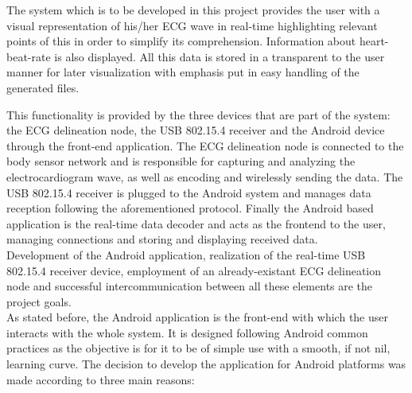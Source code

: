 		The system which is to be developed in this project provides the user with a visual representation of his/her ECG wave in real-time highlighting relevant points of this in order to simplify its comprehension. Information about heart-beat-rate %
		is also displayed. All this data is stored in a transparent to the user manner for later visualization with emphasis put in easy handling of the generated files.\\

		\begin{comment}
		¿Qué es cada parte?
		Sistema 3 partes: nodo delineador, receptor 802.15.4 y app como frontend en general. En un parrafo distino para cada una explicar las tecnologías que hemos usado y porque. 

		¿Cómo se hizo cada parte?
		(Orden, android ->shimmer->msp430->dirigir texto hacia investigación(flecha = parrafo))
		Visualizador: Android ampliamente usado, facilidad para obtener un dispositivo, no demasiado coste (al menos < iOS), plataforma abierta, desarrollo comodo.
		Shimmer: reutiliza sistema desarrollado por la complu en colaboración con EPFL
		Receptor: 

		\end{comment}
		This functionality is provided by the three devices that are part of the system: the ECG delineation node, the USB 802.15.4 receiver and the Android device through the front-end application. The ECG delineation node is connected to the body sensor network and is responsible for capturing and analyzing the electrocardiogram wave, as well as encoding and wirelessly sending the data. The USB 802.15.4 receiver is plugged to the Android system and manages data reception following the aforementioned protocol. Finally the Android based application is the real-time data decoder and acts as the frontend to the user, managing connections and storing and displaying received data.\\

		Development of the Android application, realization of the real-time USB 802.15.4 receiver device, employment of an already-existant ECG delineation node and successful intercommunication between all these elements are the project goals.\\
		
		As stated before, the Android application is the front-end with which the user interacts with the whole system. It is designed following Android common practices as the objective is for it to be of simple use with a smooth, if not nil, learning curve. The decision to develop the application for Android platforms was made according to three main reasons:\\

